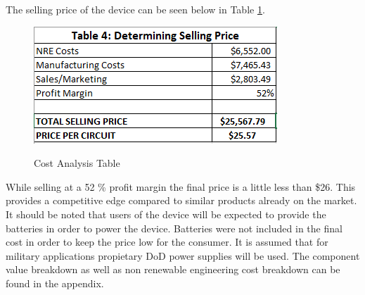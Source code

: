 
The selling price of the device can be seen below in Table \ref{fig:tablecost}.
\begin{figure}[H]
	\centering
	\caption{Cost Analysis Table}
	\includegraphics[width=0.7\linewidth]{tablecost}
	\label{fig:tablecost}
\end{figure}

While selling at a 52 \% profit margin the final price is a little less than \$26. This provides a competitive edge compared to similar products already on the market. It should be noted that users of the device will be expected to provide the batteries in order to power the device. Batteries were not included in the final cost in order to keep the price low for the consumer. It is assumed that for military applications propietary DoD power supplies will be used. The component value breakdown as well as non renewable engineering cost breakdown can be found in the appendix.

